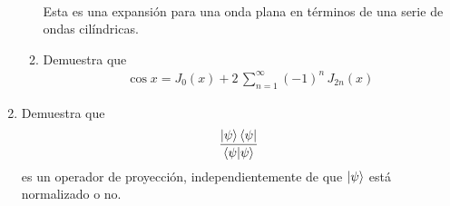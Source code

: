\begin{enumerate}
\begin{enumerate}
\begin{align*}
\end{align*}
Esta es una expansión para una onda plana en términos de una serie de ondas cilíndricas.
\item Demuestra que
\begin{align*}
\cos x = J_{0} (x) + 2 \, \sum_{n=1}^{\infty} (-1)^{n} \, J_{2n} (x)
\end{align*}
\end{enumerate}
\item Demuestra que
\begin{align*}
\dfrac{\ket{\psi}\bra{\psi}}{\braket{\psi}{\psi}}
\end{align*} es un operador de proyección, independientemente de que $\ket{\psi}$ está normalizado o no.
\end{enumerate}
